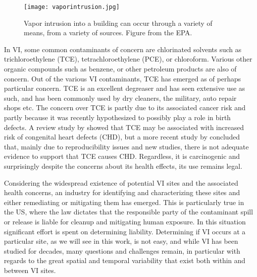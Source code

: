 \begin{figure}[htb!]
  \centering
  \texttt{[image: vaporintrusion.jpg]}
  \caption[Overview of vapor intrusion]{Vapor intrusion into a building can occur through a variety of means, from a variety of sources. Figure from the EPA\cite{us_epa_what_2015}.}
  \label{fig:vapor_intrusion}
\end{figure}

In VI, some common contaminants of concern are chlorinated solvents such as trichloroethylene (TCE), tetrachloroethylene (PCE), or chloroform.
Various other organic compounds such as benzene, or other petroleum products are also of concern.
Out of the various VI contaminants, TCE has emerged as of perhaps particular concern.
TCE is an excellent degreaser and has seen extensive use as such, and has been commonly used by dry cleaners, the military, auto repair shops etc\cite{u.s._environmental_protection_agency_oswer_2015}.
The concern over TCE is partly due to its associated cancer risk and partly because it was recently hypothesized to possibly play a role in birth defects.
A review study by \citeauthor{makris_systematic_2016}\cite{makris_systematic_2016} showed that TCE may be associated with increased risk of congenital heart defects (CHD), but a more recent study by \citeauthor{urban_systematic_2020}\cite{urban_systematic_2020} concluded that, mainly due to reproducibility issues and new studies, there is not adequate evidence to support that TCE causes CHD.
Regardless, it is carcinogenic and surprisingly despite the concerns about its health effects, its use remains legal.\par

Considering the widespread existence of potential VI sites and the associated health concerns, an industry for identifying and characterizing these sites and either remediating or mitigating them has emerged.
This is particularly true in the US, where the law dictates that the responsible party of the contaminant spill or release is liable for cleanup and mitigating human exposure.
In this situation significant effort is spent on determining liability.
Determining if VI occurs at a particular site, as we will see in this work, is not easy, and while VI has been studied for decades, many questions and challenges remain, in particular with regards to the great spatial and temporal variability that exist both within and between VI sites\cite{u.s._environmental_protection_agency_oswer_2015}.\par
